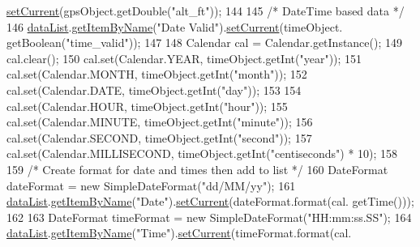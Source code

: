 \begin{DoxyCode}
      \hyperlink{classcom_1_1jack_1_1motorbikestatistics_1_1_data_item_abdeab9f088a2a78f66ac852993b555ca}{setCurrent}(gpsObject.getDouble(\textcolor{stringliteral}{"alt\_ft"}));
144 
145             \textcolor{comment}{/* DateTime based data */}
146             \hyperlink{classcom_1_1jack_1_1motorbikestatistics_1_1_realtime_fragment_adde56e8b4f0e954a9a1167e50fb80420}{dataList}.\hyperlink{classcom_1_1jack_1_1motorbikestatistics_1_1_set_of_data_items_a028fb1f4ce3fd7991d73d368720c19d9}{getItemByName}(\textcolor{stringliteral}{"Date Valid"}).\hyperlink{classcom_1_1jack_1_1motorbikestatistics_1_1_data_item_abdeab9f088a2a78f66ac852993b555ca}{setCurrent}(timeObject.
      getBoolean(\textcolor{stringliteral}{"time\_valid"}));
147 
148             Calendar cal = Calendar.getInstance();
149             cal.clear();
150             cal.set(Calendar.YEAR, timeObject.getInt(\textcolor{stringliteral}{"year"}));
151             cal.set(Calendar.MONTH, timeObject.getInt(\textcolor{stringliteral}{"month"}));
152             cal.set(Calendar.DATE, timeObject.getInt(\textcolor{stringliteral}{"day"}));
153 
154             cal.set(Calendar.HOUR, timeObject.getInt(\textcolor{stringliteral}{"hour"}));
155             cal.set(Calendar.MINUTE, timeObject.getInt(\textcolor{stringliteral}{"minute"}));
156             cal.set(Calendar.SECOND, timeObject.getInt(\textcolor{stringliteral}{"second"}));
157             cal.set(Calendar.MILLISECOND, timeObject.getInt(\textcolor{stringliteral}{"centiseconds"}) * 10);
158 
159             \textcolor{comment}{/* Create format for date and times then add to list */}
160             DateFormat dateFormat = \textcolor{keyword}{new} SimpleDateFormat(\textcolor{stringliteral}{"dd/MM/yy"});
161             \hyperlink{classcom_1_1jack_1_1motorbikestatistics_1_1_realtime_fragment_adde56e8b4f0e954a9a1167e50fb80420}{dataList}.\hyperlink{classcom_1_1jack_1_1motorbikestatistics_1_1_set_of_data_items_a028fb1f4ce3fd7991d73d368720c19d9}{getItemByName}(\textcolor{stringliteral}{"Date"}).\hyperlink{classcom_1_1jack_1_1motorbikestatistics_1_1_data_item_abdeab9f088a2a78f66ac852993b555ca}{setCurrent}(dateFormat.format(cal.
      getTime()));
162 
163             DateFormat timeFormat = \textcolor{keyword}{new} SimpleDateFormat(\textcolor{stringliteral}{"HH:mm:ss.SS"});
164             \hyperlink{classcom_1_1jack_1_1motorbikestatistics_1_1_realtime_fragment_adde56e8b4f0e954a9a1167e50fb80420}{dataList}.\hyperlink{classcom_1_1jack_1_1motorbikestatistics_1_1_set_of_data_items_a028fb1f4ce3fd7991d73d368720c19d9}{getItemByName}(\textcolor{stringliteral}{"Time"}).\hyperlink{classcom_1_1jack_1_1motorbikestatistics_1_1_data_item_abdeab9f088a2a78f66ac852993b555ca}{setCurrent}(timeFormat.format(cal.

\end{DoxyCode}
